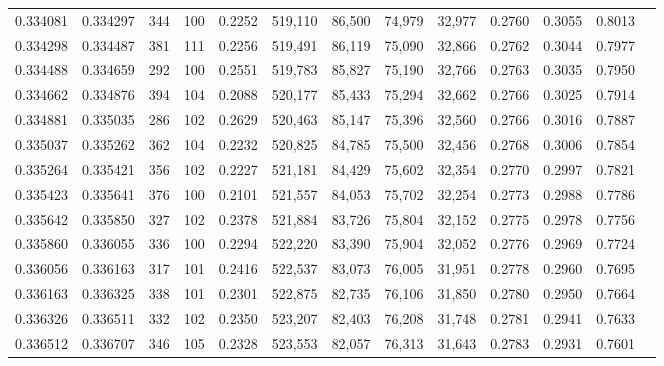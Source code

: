 \begin{tabular}{rrrrrrrrrrrrr}
0.334081 & 0.334297 &   344 & 100 &                                     0.2252 & 519,110 &  86,500 &  74,979 &  32,977 & 0.2760 & 0.3055 & 0.8013 \\
0.334298 & 0.334487 &   381 & 111 &                                     0.2256 & 519,491 &  86,119 &  75,090 &  32,866 & 0.2762 & 0.3044 & 0.7977 \\
0.334488 & 0.334659 &   292 & 100 &                                     0.2551 & 519,783 &  85,827 &  75,190 &  32,766 & 0.2763 & 0.3035 & 0.7950 \\
0.334662 & 0.334876 &   394 & 104 &                                     0.2088 & 520,177 &  85,433 &  75,294 &  32,662 & 0.2766 & 0.3025 & 0.7914 \\
0.334881 & 0.335035 &   286 & 102 &                                     0.2629 & 520,463 &  85,147 &  75,396 &  32,560 & 0.2766 & 0.3016 & 0.7887 \\
0.335037 & 0.335262 &   362 & 104 &                                     0.2232 & 520,825 &  84,785 &  75,500 &  32,456 & 0.2768 & 0.3006 & 0.7854 \\
0.335264 & 0.335421 &   356 & 102 &                                     0.2227 & 521,181 &  84,429 &  75,602 &  32,354 & 0.2770 & 0.2997 & 0.7821 \\
0.335423 & 0.335641 &   376 & 100 &                                     0.2101 & 521,557 &  84,053 &  75,702 &  32,254 & 0.2773 & 0.2988 & 0.7786 \\
0.335642 & 0.335850 &   327 & 102 &                                     0.2378 & 521,884 &  83,726 &  75,804 &  32,152 & 0.2775 & 0.2978 & 0.7756 \\
0.335860 & 0.336055 &   336 & 100 &                                     0.2294 & 522,220 &  83,390 &  75,904 &  32,052 & 0.2776 & 0.2969 & 0.7724 \\
0.336056 & 0.336163 &   317 & 101 &                                     0.2416 & 522,537 &  83,073 &  76,005 &  31,951 & 0.2778 & 0.2960 & 0.7695 \\
0.336163 & 0.336325 &   338 & 101 &                                     0.2301 & 522,875 &  82,735 &  76,106 &  31,850 & 0.2780 & 0.2950 & 0.7664 \\
0.336326 & 0.336511 &   332 & 102 &                                     0.2350 & 523,207 &  82,403 &  76,208 &  31,748 & 0.2781 & 0.2941 & 0.7633 \\
0.336512 & 0.336707 &   346 & 105 &                                     0.2328 & 523,553 &  82,057 &  76,313 &  31,643 & 0.2783 & 0.2931 & 0.7601 \\

\end{tabular}
